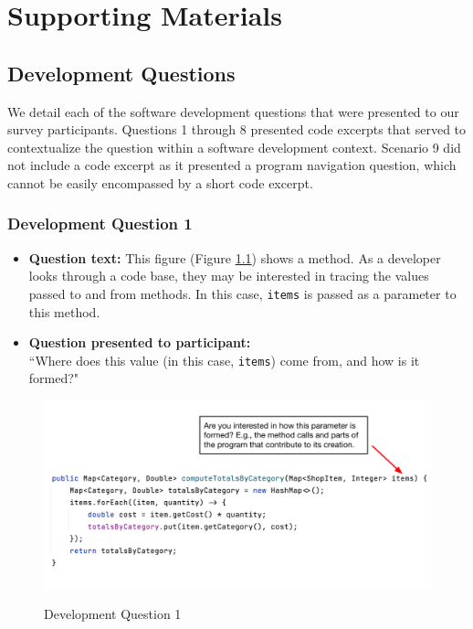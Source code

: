 \chapter{Supporting Materials}

\section{Development Questions}
\label{sec:DevelopmentQuestions}

We detail each of the software development questions that were presented to our
survey participants.
Questions 1 through 8 presented code excerpts that served to contextualize
the question within a software development context.
Scenario 9 did not include a code excerpt as it presented a program navigation
question, which cannot be easily encompassed by a short code excerpt.

\subsection{Development Question 1}

\begin{itemize}
  \item[] \textbf{Question text:} This figure (Figure \ref{fig:DS1}) shows a 
          method.
          As a developer looks through a code base, they may be interested in 
          tracing the  values passed to and from methods.
          In this case, \texttt{items} is passed as a parameter to this method.
  \item[] \textbf{Question presented to participant:}  \\
          ``Where does this value 
          (in this case, \texttt{items}) come from, and how is it formed?"
\end{itemize}

\begin{figure}[ht]
\centering
\caption{Development Question 1}
\includegraphics[width=\textwidth]{./figs/ds1.png}
\label{fig:DS1}
\end{figure}

